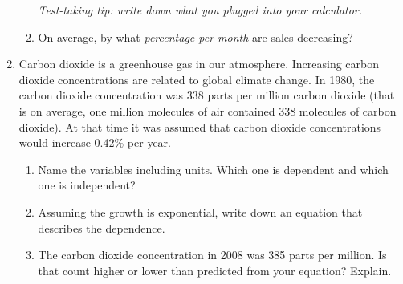 \documentclass[12pt]{article}
\begin{document}
\begin{enumerate}
\begin{enumerate}
\emph{Test-taking tip:  write down what you plugged into your calculator.}
\vfill
\vfill
\item On average, by what \textit{percentage per month} are sales decreasing?
\vfill
\end{enumerate}
\hrulefill


\item Carbon dioxide is a greenhouse gas in our atmosphere.  Increasing carbon dioxide concentrations are related to global climate change. In 1980, the carbon dioxide concentration was 338 parts per million carbon dioxide (that is on average, one million molecules of air contained 338 molecules of carbon dioxide). At that time it was assumed that carbon dioxide concentrations would increase 0.42\% per year. 

\begin{enumerate}
\item Name the variables including units.  Which one is dependent and which one is independent?
\vfill
\item Assuming the growth is exponential, write down an equation that describes the dependence.
\vfill
\item The carbon dioxide concentration in 2008 was 385 parts per million. Is that count higher or lower than predicted from your equation?  Explain.
\vfill
\end{enumerate}



\end{enumerate}
\end{document}
